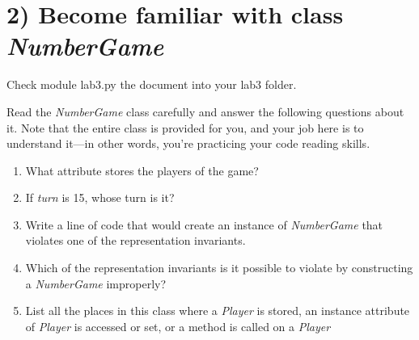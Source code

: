 \documentclass[12pt]{article}
\begin{document}
\section*{2) Become familiar with class \textit{NumberGame}}

\bigskip

Check module lab3.py the document into your lab3 folder.

\bigskip

\noindent Read the \textit{NumberGame} class carefully and answer the following questions
about it. Note that the entire class is provided for you, and your job here is
to understand it—in other words, you’re practicing your code reading skills.

\bigskip

\begin{enumerate}[1.]
    \item What attribute stores the players of the game?
    \item If \textit{turn} is 15, whose turn is it?
    \item Write a line of code that would create an instance of \textit{NumberGame}
    that violates one of the representation invariants.
    \item Which of the representation invariants is it possible to violate by
    constructing a \textit{NumberGame} improperly?
    \item List all the places in this class where a \textit{Player} is stored, an instance
    attribute of \textit{Player} is accessed or set, or a method is called on a \textit{Player}
\end{enumerate}

\bigskip
\end{document}
